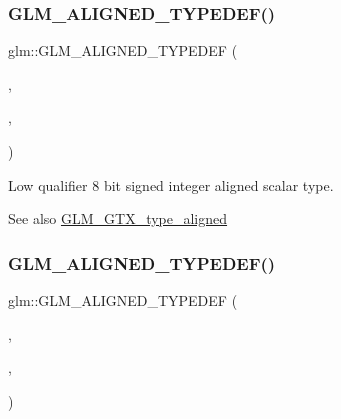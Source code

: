 \subsubsection{\texorpdfstring{G\+L\+M\+\_\+\+A\+L\+I\+G\+N\+E\+D\+\_\+\+T\+Y\+P\+E\+D\+E\+F()}{GLM\_ALIGNED\_TYPEDEF()}\hspace{0.1cm}{\footnotesize\ttfamily [9/209]}}
{\footnotesize\ttfamily glm\+::\+G\+L\+M\+\_\+\+A\+L\+I\+G\+N\+E\+D\+\_\+\+T\+Y\+P\+E\+D\+EF (\begin{DoxyParamCaption}\item[{\mbox{\hyperlink{group__gtc__type__precision_gaa2e13ee29c90f75658beed6082541097}{lowp\+\_\+i8}}}]{,  }\item[{aligned\+\_\+lowp\+\_\+i8}]{,  }\item[{1}]{ }\end{DoxyParamCaption})}

Low qualifier 8 bit signed integer aligned scalar type. \begin{DoxySeeAlso}{See also}
\mbox{\hyperlink{group__gtx__type__aligned}{G\+L\+M\+\_\+\+G\+T\+X\+\_\+type\+\_\+aligned}} 
\end{DoxySeeAlso}
\mbox{\label{group__gtx__type__aligned_ga50257b48069a31d0c8d9c1f644d267de}} 
\subsubsection{\texorpdfstring{G\+L\+M\+\_\+\+A\+L\+I\+G\+N\+E\+D\+\_\+\+T\+Y\+P\+E\+D\+E\+F()}{GLM\_ALIGNED\_TYPEDEF()}\hspace{0.1cm}{\footnotesize\ttfamily [10/209]}}
{\footnotesize\ttfamily glm\+::\+G\+L\+M\+\_\+\+A\+L\+I\+G\+N\+E\+D\+\_\+\+T\+Y\+P\+E\+D\+EF (\begin{DoxyParamCaption}\item[{\mbox{\hyperlink{group__gtc__type__precision_gaf7bbfd31bcec25a416ea94d09efb5451}{lowp\+\_\+i16}}}]{,  }\item[{aligned\+\_\+lowp\+\_\+i16}]{,  }\item[{2}]{ }\end{DoxyParamCaption})}

